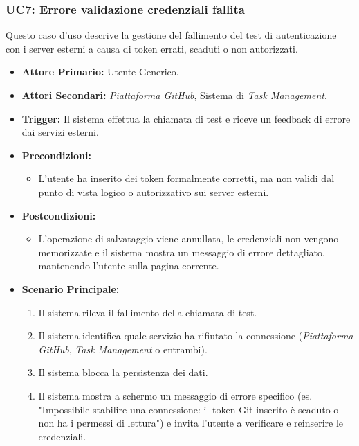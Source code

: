 \documentclass[12pt, a4paper]{article}
\begin{document}
\subsubsection{UC7: Errore validazione credenziali fallita}\label{uc:7}
Questo caso d'uso descrive la gestione del fallimento del test di autenticazione con i server esterni a causa di token errati, scaduti o non autorizzati.
\begin{itemize}
    \item \textbf{Attore Primario:} Utente Generico.
    \item \textbf{Attori Secondari:} \textit{Piattaforma GitHub}, Sistema di \textit{Task Management}.
    \item \textbf{Trigger:} Il sistema effettua la chiamata di test e riceve un feedback di errore dai servizi esterni.
    \item \textbf{Precondizioni:}\begin{itemize}\item L'utente ha inserito dei token formalmente corretti, ma non validi dal punto di vista logico o autorizzativo sui server esterni.\end{itemize}
    \item \textbf{Postcondizioni:}\begin{itemize}\item L'operazione di salvataggio viene annullata, le credenziali non vengono memorizzate e il sistema mostra un messaggio di errore dettagliato, mantenendo l'utente sulla pagina corrente.\end{itemize}
    \item \textbf{Scenario Principale:}
    \begin{enumerate}
        \item Il sistema rileva il fallimento della chiamata di test.
        \item Il sistema identifica quale servizio ha rifiutato la connessione (\textit{Piattaforma GitHub}, \textit{Task Management} o entrambi).
        \item Il sistema blocca la persistenza dei dati.
        \item Il sistema mostra a schermo un messaggio di errore specifico (es. "Impossibile stabilire una connessione: il token Git inserito è scaduto o non ha i permessi di lettura") e invita l'utente a verificare e reinserire le credenziali.
    \end{enumerate}
\end{itemize}
\end{document}
